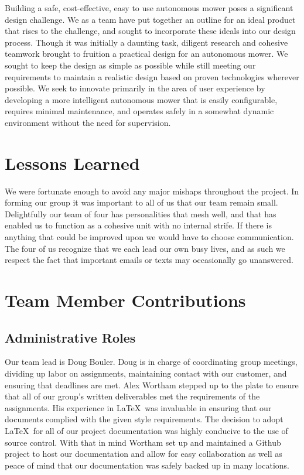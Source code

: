 \documentclass[12pt,letterpaper]{article}
\begin{document}
Building a safe, cost-effective, easy to use autonomous mower poses a
significant design challenge.  We as a team have put together an outline for an
ideal product that rises to the challenge, and sought to incorporate these
ideals into our design process.  Though it was initially a daunting task,
diligent research and cohesive teamwork brought to fruition a practical design
for an autonomous mower.  We sought to keep the design as simple as possible
while still meeting our requirements to maintain a realistic design based on
proven technologies wherever possible.  We seek to innovate primarily in the
area of user experience by developing a more intelligent autonomous mower that
is easily configurable, requires minimal maintenance, and operates safely in a
somewhat dynamic environment without the need for supervision.


\section{Lessons Learned}


We were fortunate enough to avoid any major mishaps throughout the project. In
forming our group it was important to all of us that our team remain small.
Delightfully our team of four has personalities that mesh well, and that has
enabled us to function as a cohesive unit with no internal strife.
If there is anything that could be improved upon we would have to choose
communication.  The four of us recognize that we each lead our own busy lives,
and as such we respect the fact that important emails or texts may occasionally
go unanswered.


\section{Team Member Contributions}

\subsection{Administrative Roles}
Our team lead is Doug Bouler. Doug is in charge of coordinating group
meetings, dividing up labor on assignments, maintaining contact with our
customer, and ensuring that deadlines are met.  Alex Wortham stepped up to the
plate to ensure that all of our group's written deliverables met the
requirements of the assignments.  His experience in \LaTeX\ was invaluable in
ensuring that our documents complied with the given style requirements.  The
decision to adopt \LaTeX\ for all of our project documentation was highly
conducive to the use of source control.  With that in mind Wortham set up and
maintained a Github project to host our documentation and allow for easy
collaboration as well as peace of mind that our documentation was safely backed
up in many locations.
\end{document}
